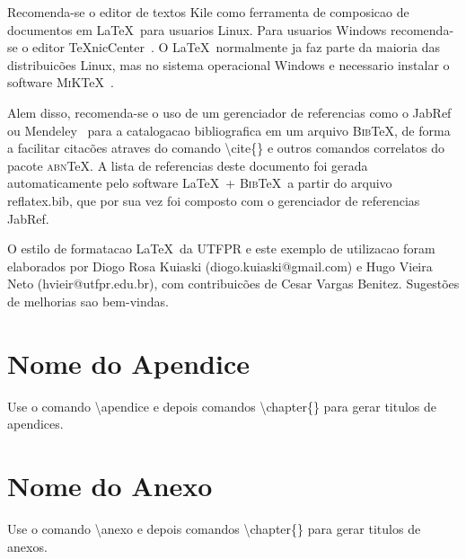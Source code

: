 \documentclass[openright]{normas-utf-tex} %
\begin{document}
Recomenda-se o editor de textos Kile como ferramenta de composicao de documentos em \LaTeX\ para usuarios Linux. Para usuarios Windows recomenda-se o editor \TeX nicCenter~\cite{TeXnicCenter2009}. O \LaTeX\ normalmente ja faz parte da maioria das distribuic\~oes Linux, mas no sistema operacional Windows e necessario instalar o software \textsc{MiK}\TeX~\cite{MiKTeX2009}.

Alem disso, recomenda-se o uso de um gerenciador de referencias como o JabRef~\cite{JabRef2009} ou Mendeley~\cite{Mendeley2009} para a catalogacao bibliografica em um arquivo \textsc{Bib}\TeX, de forma a facilitar citac\~oes atraves do comando {\ttfamily \textbackslash cite\{\}} e outros comandos correlatos do pacote \textsc{abn}\TeX. A lista de referencias deste documento foi gerada automaticamente pelo software \LaTeX\ + \textsc{Bib}\TeX\ a partir do arquivo {\ttfamily reflatex.bib}, que por sua vez foi composto com o gerenciador de referencias JabRef.

O estilo de formatacao \LaTeX\ da UTFPR e este exemplo de utilizacao foram elaborados por Diogo Rosa Kuiaski (diogo.kuiaski@gmail.com) e Hugo Vieira Neto (hvieir@utfpr.edu.br), com contribuic\~oes de Cesar Vargas Benitez. Sugest\~oes de melhorias sao bem-vindas.


\clearpage %
\label{bibstart}
\label{bibend}

\apendice
\chapter{Nome do Apendice}

Use o comando {\ttfamily \textbackslash apendice} e depois comandos {\ttfamily \textbackslash chapter\{\}}
para gerar titulos de apendices.


\anexo
\chapter{Nome do Anexo}

Use o comando {\ttfamily \textbackslash anexo} e depois comandos {\ttfamily \textbackslash chapter\{\}}
para gerar titulos de anexos.
\end{document}

